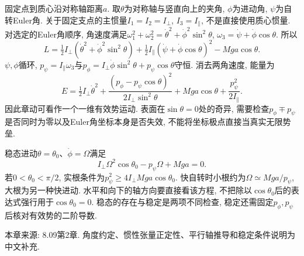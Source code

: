 \label{sec:cm-heavy-top}
固定点到质心沿对称轴距离$a$. 取$\theta$为对称轴与竖直向上的夹角, $\phi$为进动角, $\psi$为自转Euler角. 关于固定支点的主惯量$I_1=I_2=I_\perp$, $I_3=I_\parallel$, 不是直接使用质心惯量. 对选定的Euler角顺序, 角速度满足$\omega_1^2+\omega_2^2=\dot\theta^2+\dot\phi^2\sin^2\theta$, $\omega_3=\dot\psi+\dot\phi\cos\theta$. 所以
\[
L=\tfrac12I_\perp(\dot\theta^2+\dot\phi^2\sin^2\theta)
+\tfrac12I_\parallel(\dot\psi+\dot\phi\cos\theta)^2-Mga\cos\theta.
\]
$\psi,\phi$循环, $p_\psi=I_\parallel\omega_3$与$p_\phi=I_\perp\dot\phi\sin^2\theta+p_\psi\cos\theta$守恒. 消去两角速度, 能量为
\[
E=\tfrac12 I_\perp\dot\theta^2+
\frac{(p_\phi-p_\psi\cos\theta)^2}{2I_\perp\sin^2\theta}
+Mga\cos\theta+\frac{p_\psi^2}{2I_\parallel}.
\]
因此章动可看作一个一维有效势运动. 表面在$\sin\theta=0$处的奇异, 需要检查$p_\phi\mp p_\psi$是否同时为零以及Euler角坐标本身是否失效, 不能将坐标极点直接当真实无限势垒.

稳态进动$\theta=\theta_0$、$\dot\phi=\Omega$满足
\[
I_\perp\Omega^2\cos\theta_0-p_\psi\Omega+Mga=0.
\]
若$0<\theta_0<\pi/2$, 实根条件为$p_\psi^2\ge4I_\perp Mga\cos\theta_0$. 快自转时小根约为$\Omega\simeq Mga/p_\psi$, 大根为另一种快进动. 水平和向下的轴方向要直接看该方程, 不把除以$\cos\theta_0$后的表达式强行用于$\cos\theta_0=0$. 稳态的存在与稳定是两项不同检查, 稳定还需固定$p_\phi,p_\psi$后核对有效势的二阶导数.



本章来源: 8.09第2章. 角度约定、惯性张量正定性、平行轴推导和稳定条件说明为中文补充.
